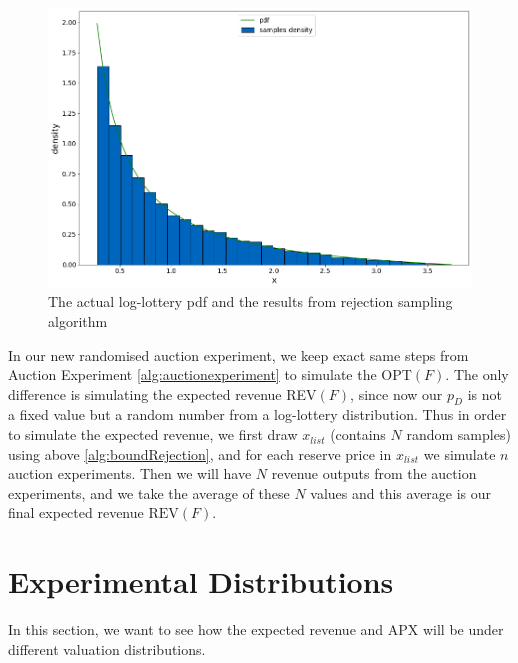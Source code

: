 \begin{figure}[H]
	\centering
	\includegraphics[width=1\textwidth]{rejectionS}
	\caption{The actual log-lottery pdf and the results from rejection sampling algorithm}
	\label{fig:rejectionS}
\end{figure} 

In our new randomised auction experiment, we keep exact same steps from Auction Experiment \ref{alg:auctionexperiment} to simulate the OPT$(F)$. The only difference is simulating the expected revenue REV$(F)$, since now our $p_D$ is not a fixed value but a random number from a log-lottery distribution. Thus in order to simulate the expected revenue, we first draw $x_{list}$ (contains $N$ random samples) using above \cref{alg:boundRejection}, and for each reserve price in $x_{list}$ we simulate $n$ auction experiments. Then we will have $N$ revenue outputs from the auction experiments, and we take the average of these $N$ values and this average is our final expected revenue $\text{REV}(F)$.


\newpage
\section{Experimental Distributions}
In this section, we want to see how the expected revenue and APX will be under different valuation distributions.

